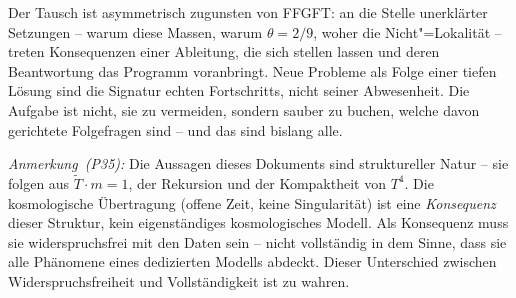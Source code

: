 Der Tausch ist asymmetrisch zugunsten von FFGFT: an die Stelle unerklärter
Setzungen -- warum diese Massen, warum $\theta = 2/9$,
woher die Nicht"=Lokalität -- treten Konsequenzen einer Ableitung, die sich
stellen lassen und deren Beantwortung das Programm voranbringt. Neue Probleme
als Folge einer tiefen Lösung sind die Signatur echten Fortschritts, nicht
seiner Abwesenheit. Die Aufgabe ist nicht, sie zu vermeiden, sondern sauber
zu buchen, welche davon gerichtete Folgefragen sind -- und das sind bislang
alle.

\bigskip
\noindent\textit{Anmerkung~(P35):} Die Aussagen dieses Dokuments sind
struktureller Natur -- sie folgen aus $\tilde{T} \cdot m = 1$, der
Rekursion und der Kompaktheit von $T^4$. Die kosmologische Übertragung
(offene Zeit, keine Singularität) ist eine \emph{Konsequenz} dieser Struktur,
kein eigenständiges kosmologisches Modell. Als Konsequenz muss sie
widerspruchsfrei mit den Daten sein -- nicht vollständig in dem Sinne, dass
sie alle Phänomene eines dedizierten Modells abdeckt. Dieser Unterschied
zwischen Widerspruchsfreiheit und Vollständigkeit ist zu wahren.

